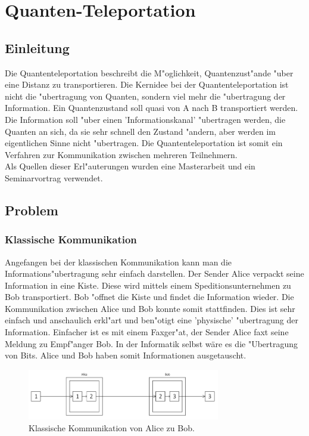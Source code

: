 \chapter{Quanten-Teleportation\label{chapter:teleport}}
\begin{refsection}

\section{Einleitung}
Die Quantenteleportation beschreibt die M"oglichkeit, Quantenzust"ande "uber eine Distanz zu transportieren. Die Kernidee bei der Quantenteleportation ist nicht die "ubertragung von Quanten, sondern viel mehr die "ubertragung der Information. Ein Quantenzustand soll quasi von A nach B transportiert werden. Die Information soll "uber einen 'Informationskanal' "ubertragen werden, die Quanten an sich, da sie sehr schnell den Zustand "andern, aber werden im eigentlichen Sinne nicht "ubertragen. Die Quantenteleportation ist somit ein Verfahren zur Kommunikation zwischen mehreren Teilnehmern.
\\
Als Quellen dieser Erl"auterungen wurden eine Masterarbeit\cite{teleport:mscthesis} und ein Seminarvortrag\cite{teleport:teleport-seminar} verwendet.
\section{Problem}
\subsection{Klassische Kommunikation}
Angefangen bei der klassischen Kommunikation kann man die Informations"ubertragung sehr einfach darstellen. Der Sender Alice verpackt seine Information in eine Kiste. Diese wird mittels einem Speditionsunternehmen zu Bob transportiert. Bob "offnet die Kiste und findet die Information wieder. Die Kommunikation zwischen Alice und Bob konnte somit stattfinden. Dies ist sehr einfach und anschaulich erkl"art und ben"otigt eine 'physische' "ubertragung der Information. Einfacher ist es mit einem Faxger"at, der Sender Alice faxt seine Meldung zu Empf"anger Bob. In der Informatik selbst wäre es die "Ubertragung von Bits. Alice und Bob haben somit Informationen ausgetauscht.
\begin{figure}
\center
\includegraphics[width=0.75\textwidth]{teleport/image/classic_communication.png}
\caption{Klassische Kommunikation von Alice zu Bob.}
\label{Klassische Kommunikation}
\end{figure}

\end{refsection}
